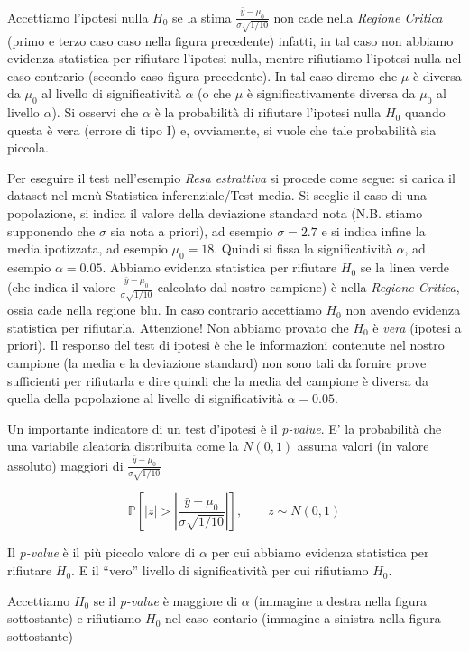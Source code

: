 \documentclass[
  11pt,
]{book}
\begin{document}
Accettiamo l'ipotesi nulla \(H_0\) se la stima \(\frac{\bar{y}-\mu_0}{\sigma\sqrt{1/10}}\) non cade nella \emph{Regione Critica} (primo e terzo caso caso nella figura precedente) infatti, in tal caso non abbiamo evidenza statistica per rifiutare l'ipotesi nulla, mentre rifiutiamo l'ipotesi nulla nel caso contrario (secondo caso figura precedente).
In tal caso diremo che \(\mu\) è diversa da \(\mu_0\) al livello di significatività \(\alpha\) (o che \(\mu\) è significativamente diversa da \(\mu_0\) al livello \(\alpha\)).
Si osservi che \(\alpha\) è la probabilità di rifiutare l'ipotesi nulla \(H_0\) quando questa è vera (errore di tipo I) e, ovviamente, si vuole che tale probabilità sia piccola.

Per eseguire il test nell'esempio \emph{Resa estrattiva} si procede come segue: si carica il dataset nel menù Statistica inferenziale/Test media. Si sceglie il caso di una popolazione, si indica il valore della deviazione standard nota (N.B. stiamo supponendo che \(\sigma\) sia nota a priori), ad esempio \(\sigma =2.7\) e si indica infine la media ipotizzata, ad esempio \(\mu_0=18\). Quindi si fissa la significatività \(\alpha\), ad esempio \(\alpha=0.05\). Abbiamo evidenza statistica per rifiutare \(H_0\) se la linea verde (che indica il valore \(\frac{\bar{y}-\mu_0}{\sigma\sqrt{1/10}}\) calcolato dal nostro campione) è nella \emph{Regione Critica}, ossia cade nella regione blu. In caso contrario accettiamo \(H_0\) non avendo evidenza statistica per rifiutarla.
Attenzione! Non abbiamo provato che \(H_0\) è \emph{vera} (ipotesi a priori). Il responso del test di ipotesi è che le informazioni contenute nel nostro campione (la media e la deviazione standard) non sono tali da fornire prove sufficienti per rifiutarla e dire quindi che la media del campione è diversa da quella della popolazione al livello di significatività \(\alpha=0.05\).

Un importante indicatore di un test d'ipotesi è il \emph{p-value}. E' la probabilità che una variabile aleatoria distribuita come la \(N(0,1)\) assuma valori (in valore assoluto) maggiori di \(\frac{\bar{y}-\mu_0}{\sigma\sqrt{1/10}}\)

\[
\mathbb{P}[|z|>|\frac{\bar{y}-\mu_0}{\sigma\sqrt{1/10}}|], \qquad z \sim N(0,1)
\]

Il \emph{p-value} è il più piccolo valore di \(\alpha\) per cui abbiamo evidenza statistica per rifiutare \(H_0\). E il ``vero'' livello di significatività per cui rifiutiamo \(H_0\).

Accettiamo \(H_0\) se il \emph{p-value} è maggiore di \(\alpha\) (immagine a destra nella figura sottostante) e rifiutiamo \(H_0\) nel caso contario (immagine a sinistra nella figura sottostante)
\end{document}
